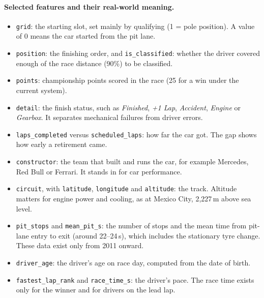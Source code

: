 \paragraph{Selected features and their real-world meaning.}
\begin{itemize}
  \item \texttt{grid}: the starting slot, set mainly by qualifying (1 = pole position). A value of 0 means
        the car started from the pit lane.
  \item \texttt{position}: the finishing order, and \texttt{is\_classified}: whether the driver covered enough
        of the race distance (90\%) to be classified.
  \item \texttt{points}: championship points scored in the race (25 for a win under the current system).
  \item \texttt{detail}: the finish status, such as \emph{Finished}, \emph{+1 Lap}, \emph{Accident},
        \emph{Engine} or \emph{Gearbox}. It separates mechanical failures from driver errors.
  \item \texttt{laps\_completed} versus \texttt{scheduled\_laps}: how far the car got. The gap shows how early a retirement came.
  \item \texttt{constructor}: the team that built and runs the car, for example Mercedes, Red Bull or Ferrari.
        It stands in for car performance.
  \item \texttt{circuit}, with \texttt{latitude}, \texttt{longitude} and \texttt{altitude}: the track. Altitude
        matters for engine power and cooling, as at Mexico City, 2{,}227\,m above sea level.
  \item \texttt{pit\_stops} and \texttt{mean\_pit\_s}: the number of stops and the mean time from pit-lane entry to exit
        (around 22--24\,s), which includes the stationary tyre change. These data exist only from 2011 onward.
  \item \texttt{driver\_age}: the driver's age on race day, computed from the date of birth.
  \item \texttt{fastest\_lap\_rank} and \texttt{race\_time\_s}: the driver's pace. The race time exists only for
        the winner and for drivers on the lead lap.
\end{itemize}
